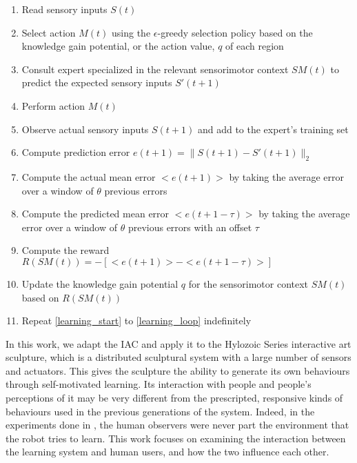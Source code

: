\begin{enumerate}
	\item \label{learning_start} Read sensory inputs $S(t)$
	\item Select action $M(t)$ using the $\epsilon$-greedy selection policy based on the knowledge gain potential, or the action value, $q$ of each region
	\item Consult expert specialized in the relevant sensorimotor context $SM(t)$ to predict the expected sensory inputs $S'(t+1)$
	\item Perform action $M(t)$
	\item Observe actual sensory inputs $S(t+1)$ and add to the expert's training set
	\item Compute prediction error $e(t+1) = \|S(t+1) - S'(t+1)\|_2$
	\item Compute the actual mean error $<e(t+1)>$ by taking the average error over a window of $\theta$ previous errors
	\item Compute the predicted mean error $<e(t+1-\tau)>$ by taking the average error over a window of $\theta$ previous errors with an offset $\tau$
	\item Compute the reward $R(SM(t)) = -[<e(t+1)> - <e(t+1-\tau)>]$
	\item Update the knowledge gain potential $q$ for the sensorimotor context $SM(t)$ based on $R(SM(t))$
	\item \label{learning_loop} Repeat \ref{learning_start} to \ref{learning_loop} indefinitely
\end{enumerate}

In this work, we adapt the IAC and apply it to the Hylozoic Series interactive art sculpture, which is a distributed sculptural system with a large number of sensors and actuators. This gives the sculpture the ability to generate its own behaviours through self-motivated learning. Its interaction with people and people's perceptions of it may be very different from the prescripted, responsive kinds of behaviours used in the previous generations of the system. Indeed, in the experiments done in \cite{Oudeyer2007}, the human observers were never part the environment that the robot tries to learn. This work focuses on examining the interaction between the learning system and human users, and how the two influence each other.

